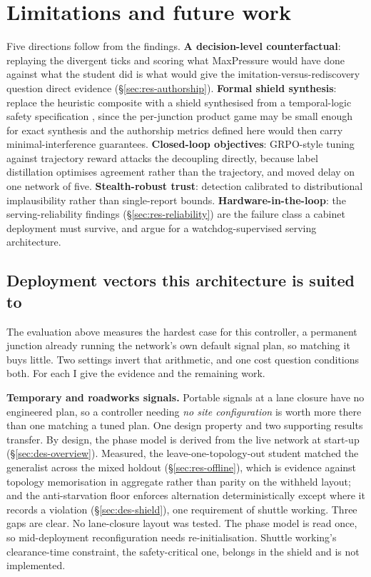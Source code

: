\section{Limitations and future work}\label{sec:dis-future}
Five directions follow from the findings. \textbf{A decision-level
counterfactual}: replaying the divergent ticks and scoring what
MaxPressure would have done against what the student did is what would
give the imitation-versus-rediscovery question direct evidence
(\S\ref{sec:res-authorship}). \textbf{Formal shield
synthesis}: replace the heuristic composite with a shield synthesised from
a temporal-logic safety specification \cite{alshiekh2018shield}, since the
per-junction product game may be small enough for exact synthesis and the
authorship metrics defined here would then carry minimal-interference
guarantees. \textbf{Closed-loop objectives}: GRPO-style tuning against
trajectory reward \cite{dglight2026} attacks the decoupling directly,
because label distillation optimises agreement rather than the
trajectory, and moved delay on one network of five.
\textbf{Stealth-robust trust}: detection calibrated to distributional
implausibility rather than single-report bounds.
\textbf{Hardware-in-the-loop}: the serving-reliability findings
(\S\ref{sec:res-reliability}) are the failure class a cabinet deployment
must survive, and argue for a watchdog-supervised serving architecture.

\subsection{Deployment vectors this architecture is suited to}
The evaluation above measures the hardest case for this controller, a
permanent junction already running the network's own default signal
plan, so matching it buys little. Two settings invert that arithmetic,
and one cost question conditions both. For each I give the evidence and
the remaining work.

\textbf{Temporary and roadworks signals.} Portable signals at a lane
closure have no engineered plan, so a controller needing \emph{no site configuration}
is worth more there than one matching a tuned plan. One design property
and two supporting results transfer. By design, the phase model is
derived from the live network at start-up (\S\ref{sec:des-overview}).
Measured, the leave-one-topology-out
student matched the generalist across the mixed holdout
(\S\ref{sec:res-offline}), which is
evidence against topology memorisation in aggregate rather than parity on
the withheld layout; and the anti-starvation floor
enforces alternation deterministically except where it records a
violation (\S\ref{sec:des-shield}), one requirement of
shuttle working. Three gaps are clear. No lane-closure layout was
tested. The phase model is read once, so mid-deployment
reconfiguration needs re-initialisation. Shuttle working's clearance-time
constraint, the safety-critical one, belongs in the shield and is not
implemented.


